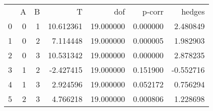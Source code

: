 \begin{tabular}{lrrrrrr}
 & A & B & T & dof & p-corr & hedges \\
0 & 0 & 1 & 10.612361 & 19.000000 & 0.000000 & 2.480849 \\
1 & 0 & 2 & 7.114448 & 19.000000 & 0.000005 & 1.982903 \\
2 & 0 & 3 & 10.531342 & 19.000000 & 0.000000 & 2.878235 \\
3 & 1 & 2 & -2.427415 & 19.000000 & 0.151900 & -0.552716 \\
4 & 1 & 3 & 2.924596 & 19.000000 & 0.052172 & 0.756294 \\
5 & 2 & 3 & 4.766218 & 19.000000 & 0.000806 & 1.228698 \\
\end{tabular}
